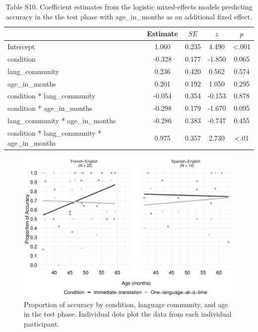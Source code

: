 \documentclass[
  man,floatsintext]{apa7}
\begin{document}
\begin{table}[H]

\begin{center}
\begin{threeparttable}

\caption{\label{tab:unnamed-chunk-30}Table S10. Coefficient estimates from the logistic mixed-effects models predicting accuracy in the the test phase with age\_in\_months as an additional fixed effect.}

\begin{tabular}{lcccc}
\toprule
 & Estimate & $SE$ & $z$ & $p$\\
\midrule
Intercept & 1.060 & 0.235 & 4.490 & <.001\\
condition & -0.328 & 0.177 & -1.850 & 0.065\\
lang\_community & 0.236 & 0.420 & 0.562 & 0.574\\
age\_in\_months & 0.201 & 0.192 & 1.050 & 0.295\\
condition * lang\_community & -0.054 & 0.354 & -0.153 & 0.878\\
condition * age\_in\_months & -0.298 & 0.179 & -1.670 & 0.095\\
lang\_community * age\_in\_months & -0.286 & 0.383 & -0.747 & 0.455\\
condition * lang\_community * age\_in\_months & 0.975 & 0.357 & 2.730 & <.01\\
\bottomrule
\end{tabular}

\end{threeparttable}
\end{center}

\end{table}

\begin{figure}

{\centering \includegraphics[width=0.9\linewidth]{TabletSwitch_supplemental_files/figure-latex/FigureS6-1} 

}

\caption{Proportion of accuracy by condition, language community, and age in the test phase. Individual dots plot the data from each individual participant.}\label{fig:FigureS6}
\end{figure}
\end{document}

